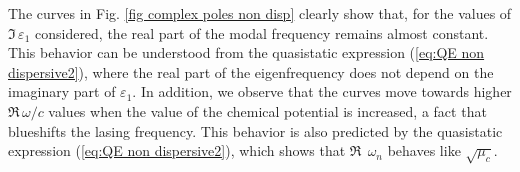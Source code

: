 \documentclass[9pt,twocolumn,twoside]{osajnl}
\begin{document}
The curves in Fig. \ref{fig complex poles non disp} clearly show that, 
for the values of $\Im\,\varepsilon_1$ considered, the real part of the modal frequency remains almost constant. 
This behavior can be understood from the quasistatic expression (\ref{eq:QE non dispersive2}), where the real part of the eigenfrequency does not depend on the   imaginary part of $\varepsilon_1$. 
%
In addition, we observe that the curves move towards higher $\Re\,\omega/c$ values when the value of the chemical potential is increased, a fact that blueshifts the lasing frequency. This behavior is also predicted by the quasistatic expression (\ref{eq:QE non dispersive2}), which shows that $\Re\,\;\omega_n$ behaves like $\sqrt{\mu_c}$.


\end{document}

